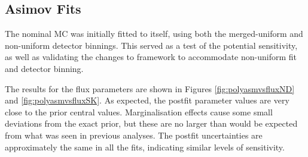 \subsection{Asimov Fits}

The nominal MC was initially fitted to itself, using both the merged-uniform and non-uniform detector binnings. This served as a test of the potential sensitivity, as well as validating the changes to framework to accommodate non-uniform fit and detector binning. 

The results for the flux parameters are shown in Figures \ref{fig:polyasmvsfluxND} and \ref{fig:polyasmvsfluxSK}. As expected, the postfit parameter values are very close to the prior central values. Marginalisation effects cause some small deviations from the exact prior, but these are no larger than would be expected from what was seen in previous analyses. The postfit uncertainties are approximately the same in all the fits, indicating similar levels of sensitivity.

